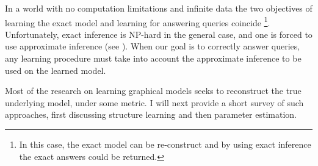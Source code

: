 In a world with no computation limitations and infinite data the two objectives of learning the exact model and learning for answering queries coincide
\footnote{In this case, the exact model can be re-construct and by using exact inference the exact answers could be returned.}.
Unfortunately, exact inference is NP-hard in the general case, and one is forced to use approximate inference (see ).
When our goal is to correctly answer queries, any learning procedure must take into account the approximate inference to be used on the learned model.

Most of the research on learning graphical models seeks to reconstruct the true underlying model, under some metric. I will next provide a short survey of such approaches, first discussing structure learning and then parameter estimation.



